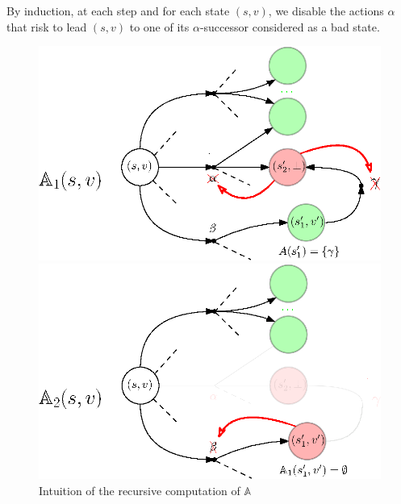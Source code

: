 By induction, at each step and for each state $(s, v)$,
we disable the actions $\alpha$
that risk to lead $(s, v)$ to one of its $\alpha$-successor considered as a bad state.%
\begin{figure}[h]
  \begin{minipage}{0.5\linewidth}
    \centering
    \includegraphics[width=0.9\linewidth]{resources/attractor}
  \end{minipage}
  \begin{minipage}{0.5\linewidth}
    \centering
    \includegraphics[width=0.9\linewidth]{resources/attractor2}
  \end{minipage}
  \caption{Intuition of the recursive computation of $\mathbb{A}$}
\end{figure}

